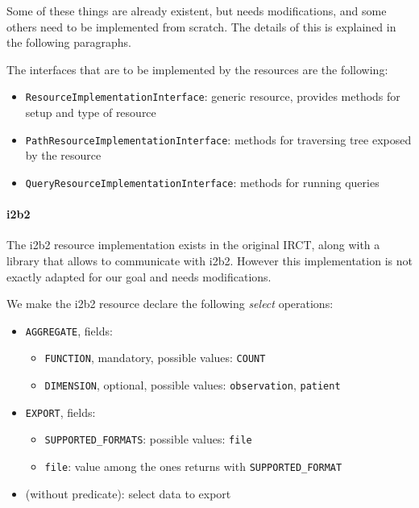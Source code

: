 Some of these things are already existent, but needs modifications, and some others need to be implemented from scratch.
The details of this is explained in the following paragraphs.

The interfaces that are to be implemented by the resources are the following:
\begin{itemize}
    \item \verb|ResourceImplementationInterface|: generic resource, provides methods for setup and type of resource
    \item \verb|PathResourceImplementationInterface|: methods for traversing tree exposed by the resource
    \item \verb|QueryResourceImplementationInterface|: methods for running queries
\end{itemize}

\paragraph{i2b2}
The i2b2 resource implementation exists in the original IRCT, along with a library that allows to communicate with i2b2.
However this implementation is not exactly adapted for our goal and needs modifications.

We make the i2b2 resource declare the following \emph{select} operations:
\begin{itemize}
    \item \verb|AGGREGATE|, fields:
    \begin{itemize}
        \item \verb|FUNCTION|, mandatory, possible values:
        \verb|COUNT|
        
        \item \verb|DIMENSION|, optional, possible values:
        \verb|observation|,
        \verb|patient|
    \end{itemize}
    
    \item \verb|EXPORT|, fields:
    \begin{itemize}
        \item \verb|SUPPORTED_FORMATS|: possible values: \verb|file| %
        \item \verb|file|: value among the ones returns with \verb|SUPPORTED_FORMAT|
    \end{itemize}
    
    \item (without predicate): select data to export
\end{itemize}

